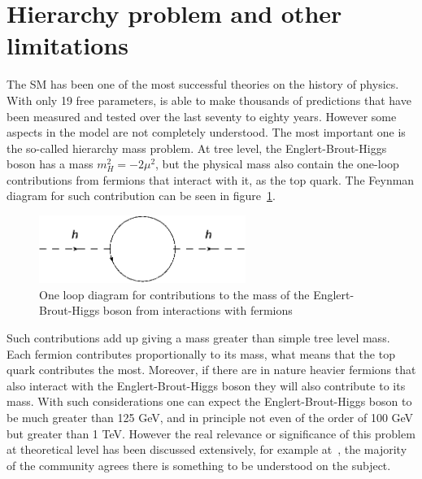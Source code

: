 
\section{Hierarchy problem and other limitations}
\label{sec:hier}

The SM has been one of the most successful theories on the history of physics. With only 19 free parameters, is able to make thousands of predictions that have been measured and tested over the last seventy to eighty years. However some aspects in the model are not completely understood. The most important one is the so-called hierarchy mass problem. At tree level, the Englert-Brout-Higgs boson has a mass $m_{H}^{2}=-2\mu^{2}$, but the physical mass also contain the one-loop contributions from fermions that interact with it, as the top quark. The Feynman diagram for such contribution can be seen in figure~\ref{fig:oneloophiggs}.

\begin{figure}[!Hhtbp]
  \begin{center}
    \includegraphics[width=0.6\textwidth]{figs/HierarchyLoop.png}
    \caption{One loop diagram for contributions to the mass of the Englert-Brout-Higgs boson from interactions with fermions}
    \label{fig:oneloophiggs}
  \end{center}
\end{figure}

Such contributions add up giving a mass greater than simple tree level mass. Each fermion contributes proportionally to its mass, what means that the top quark contributes the most. Moreover, if there are in nature heavier fermions that also interact with the Englert-Brout-Higgs boson they will also contribute to its mass. With such considerations one can expect the Englert-Brout-Higgs boson to be much greater than 125 GeV, and in principle not even of the order of 100 GeV but greater than 1 TeV. However the real relevance or significance of this problem at theoretical level has been discussed extensively, for example at~\cite{Jegerlehner:2013nna}, the majority of the community agrees there is something to be understood on the subject. 

